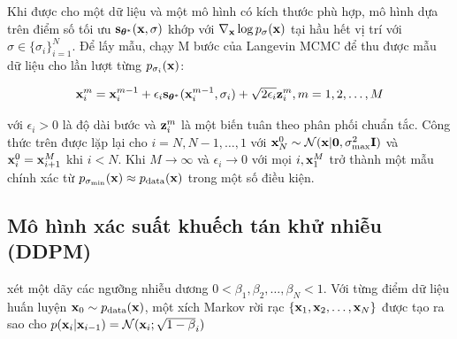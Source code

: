 \documentclass{article} %
\begin{document}
Khi được cho một dữ liệu và một mô hình có kích thước phù hợp, mô hình dựa trên điểm số tối ưu $\bold{s}_{\boldsymbol{\theta}^{\ast}}(\bold{x}, \sigma)$ khớp với $\nabla_{\bold{x}} \log p_{\sigma}(\bold{x})$ tại hầu hết vị trí với $\sigma \in \lbrace \sigma_i \rbrace_{i=1}^N$.
Để lấy mẫu, \citep{song2019generative} chạy M bước của Langevin MCMC để thu được mẫu dữ liệu cho lần lượt từng $p_{\sigma_i}(\bold{x})$:

\begin{equation}
    \bold{x}_i^m = \bold{x}_i^{m-1} + \epsilon_i \bold{s}_{\boldsymbol{\theta}^{\ast}} (\bold{x}_i^{m-1}, \sigma_i) + \sqrt{2 \epsilon_i} \bold{z}_i^m, m = 1, 2, \dots, M
\end{equation}

với $\epsilon_i > 0$ là độ dài bước và $\bold{z}_i^m$ là một biến tuân theo phân phối chuẩn tắc.
Công thức trên được lặp lại cho $i=N, N-1, \dots, 1$ với $\bold{x}_N^0 \sim \mathcal{N}(\bold{x} \vert \bold{0}, \sigma_{\max}^2 \bold{I})$ và $\bold{x}_i^0 = \bold{x}_{i+1}^M$ khi $i < N$. Khi $M \rightarrow \infty$ và $\epsilon_i \rightarrow 0$ với mọi $i, \bold{x}_1^M$ trở thành một mẫu chính xác từ $p_{\sigma_{\min}}(\bold{x})\approx p_{\mathrm{data}}(\bold{x})$ trong một số điều kiện.


\subsection{Mô hình xác suất khuếch tán khử nhiễu (DDPM)}

\citep{sohl2015deep,ho2020denoising} xét một dãy các ngưỡng nhiễu dương $0 < \beta_1, \beta_2, \dots, \beta_N < 1$.
Với từng điểm dữ liệu huấn luyện $\bold{x}_0 \sim p_{\mathrm{data}}(\bold{x})$, một xích Markov rời rạc $\lbrace \bold{x}_1, \bold{x}_2, \dots, \bold{x}_N \rbrace$ được tạo ra sao cho $p(\bold{x}_i \vert \bold{x}_{i-1}) = \mathcal{N}(\bold{x}_i; \sqrt{1-\beta}_i)$

\newpage


\end{document}
